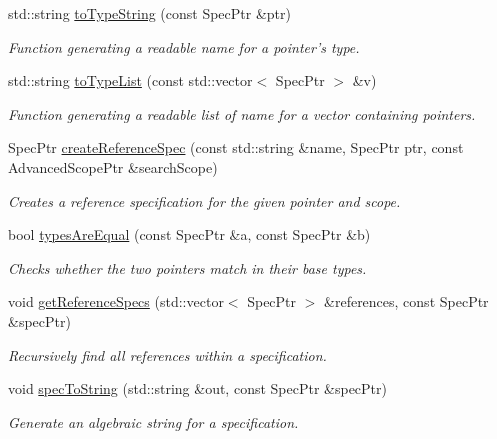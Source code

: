 \begin{DoxyCompactItemize}
\item 
std\-::string \hyperlink{namespacegiskard__suturo_a7422ff891e906e0c310b0d367aa1923f}{to\-Type\-String} (const Spec\-Ptr \&ptr)
\begin{DoxyCompactList}\small\item\em Function generating a readable name for a pointer's type. \end{DoxyCompactList}\item 
std\-::string \hyperlink{namespacegiskard__suturo_a3cf64ee2312259561b2233bb6ab49407}{to\-Type\-List} (const std\-::vector$<$ Spec\-Ptr $>$ \&v)
\begin{DoxyCompactList}\small\item\em Function generating a readable list of name for a vector containing pointers. \end{DoxyCompactList}\item 
Spec\-Ptr \hyperlink{namespacegiskard__suturo_a5e83380e9ad0f2db959b164a053d067e}{create\-Reference\-Spec} (const std\-::string \&name, Spec\-Ptr ptr, const Advanced\-Scope\-Ptr \&search\-Scope)
\begin{DoxyCompactList}\small\item\em Creates a reference specification for the given pointer and scope. \end{DoxyCompactList}\item 
bool \hyperlink{namespacegiskard__suturo_ac48a6c03a8d8075fa49de9f95cc221cc}{types\-Are\-Equal} (const Spec\-Ptr \&a, const Spec\-Ptr \&b)
\begin{DoxyCompactList}\small\item\em Checks whether the two pointers match in their base types. \end{DoxyCompactList}\item 
void \hyperlink{namespacegiskard__suturo_a0a73358f561b3d17b2d95baab89ae2f5}{get\-Reference\-Specs} (std\-::vector$<$ Spec\-Ptr $>$ \&references, const Spec\-Ptr \&spec\-Ptr)
\begin{DoxyCompactList}\small\item\em Recursively find all references within a specification. \end{DoxyCompactList}\item 
void \hyperlink{namespacegiskard__suturo_adfd20df97230fb7568548e9f4468b370}{spec\-To\-String} (std\-::string \&out, const Spec\-Ptr \&spec\-Ptr)
\begin{DoxyCompactList}\small\item\em Generate an algebraic string for a specification. \end{DoxyCompactList}\item 

\end{DoxyCompactItemize}
